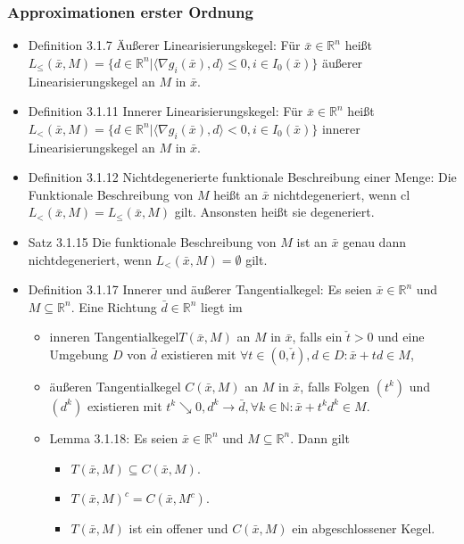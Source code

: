\documentclass[paper=a4, fontsize=11pt]{scrartcl} %
\numberwithin{equation}{section} %
\numberwithin{figure}{section} %
\numberwithin{table}{section} %
\begin{document}
\subsubsection{Approximationen erster Ordnung}

\begin{itemize}
  \item Definition 3.1.7 Äußerer Linearisierungskegel: Für $\bar{x} \in \mathbb{R}^n$ heißt $L_\le(\bar{x},M) = \{ d \in \mathbb{R}^n | \langle \nabla g_i(\bar{x}),d \rangle \le 0, i \in I_0(\bar{x})\}$ äußerer Linearisierungskegel an $M$ in $\bar{x}$.
  \item Definition 3.1.11 Innerer Linearisierungskegel: Für $\bar{x} \in \mathbb{R}^n$ heißt $L_<(\bar{x},M) = \{ d \in \mathbb{R}^n | \langle \nabla g_i(\bar{x}),d \rangle < 0, i \in I_0(\bar{x})\}$ innerer Linearisierungskegel an $M$ in $\bar{x}$.
  \item Definition 3.1.12 Nichtdegenerierte funktionale Beschreibung einer Menge: Die Funktionale Beschreibung von $M$ heißt an $\bar{x}$ nichtdegeneriert, wenn cl$L_<(\bar{x},M) = L_\le(\bar{x},M)$ gilt. Ansonsten heißt sie degeneriert.
  \item Satz 3.1.15 Die funktionale Beschreibung von $M$ ist an $\bar{x}$ genau dann nichtdegeneriert, wenn $L_<(\bar{x},M) = \emptyset$ gilt.
  \item Definition 3.1.17 Innerer und äußerer Tangentialkegel: Es seien $\bar{x} \in \mathbb{R}^n$ und $M \subseteq \mathbb{R}^n$. Eine Richtung $\bar{d} \in \mathbb{R}^n$ liegt im
  \begin{itemize}
    \item inneren Tangentialkegel$T(\bar{x},M)$ an $M$ in $\bar{x}$, falls ein $\check{t} > 0$ und eine Umgebung $D$ von $\bar{d}$ existieren mit $\forall t \in (0,\check{t}), d \in D: \bar{x} + td \in M$,
    \item äußeren Tangentialkegel $C(\bar{x},M)$ an $M$ in $\bar{x}$, falls Folgen $(t^k)$ und $(d^k)$ existieren mit $t^k \searrow 0, d^k \rightarrow \bar{d}, \forall k \in \mathbb{N}: \bar{x} + t^kd^k \in M$.
    \item Lemma 3.1.18: Es seien $\bar{x} \in \mathbb{R}^n$ und $M \subseteq \mathbb{R}^n$. Dann gilt
    \begin{itemize}
      \item $T(\bar{x},M) \subseteq C(\bar{x},M)$.
      \item $T(\bar{x},M)^c = C(\bar{x},M^c)$.
      \item $T(\bar{x},M)$ ist ein offener und $C(\bar{x},M)$ ein abgeschlossener Kegel.

\end{itemize}
\end{itemize}
\end{itemize}
\end{document}
